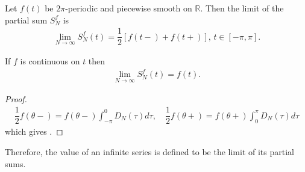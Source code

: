 \begin{theorem}
Let $f(t)$ be $2\pi$-periodic and piecewise smooth on $\mathbb{R}$. Then the limit of the partial sum $S_N^f$ is
	\begin{align*}
		\lim_{N\to\infty} S_N^f (t) = \dfrac{1}{2}\left[f(t-) + 		f(t+)\right], \, t \in [-\pi, \pi].
	\end{align*}

If $f$ is continuous on $t$ then
	\begin{align*}
		\lim_{N\to \infty} S_N^f(t) = f(t).
	\end{align*}
\end{theorem}

\begin{proof}
	\begin{align*}
		\dfrac{1}{2} f(\theta-) = f(\theta-) \int_{-\pi}^0 				D_N(\tau)d\tau, \quad \dfrac{1}{2}f(\theta+) = 					f(\theta+) \int_0^\pi D_N (\tau)d\tau
	\end{align*}
	which gives .
\end{proof}

Therefore, the value of an infinite series is defined to be the limit of its partial sums.



